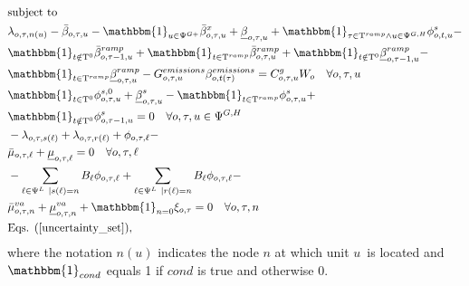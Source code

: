 \documentclass[final]{IEEEtran}
\newcommand{\Tau}{\mathrm{T}}
\begin{document}
\begin{align}
&\text{subject to} \nonumber \\
&\lambda_{o, \tau, n(u)} - \bar{\beta}_{o, \tau, u} - \mathbbm{1}_{u \in \Psi^{G+}} \bar{\beta}^x_{o, \tau, u} + \underline{\beta}_{o, \tau, u} + \mathbbm{1}_{\tau \in \Tau^{ramp} \land u \in \Psi^{G, H}} \phi_{o, t, u}^{s} - \nonumber \\
&\mathbbm{1}_{t \notin \Tau^0} \bar{\beta}_{o, \tau - 1, u}^{ramp} + \mathbbm{1}_{t \in \Tau^{ramp}} \bar{\beta}_{o, \tau, u}^{ramp} + \mathbbm{1}_{t \notin \Tau^0} \underline{\beta}_{o, \tau - 1, u}^{ramp} - \nonumber \\
&\label{sub_constr1}\mathbbm{1}_{t \in \Tau^{ramp}} \underline{\beta}_{o, \tau, u}^{ramp} - G_{o, \tau, u}^{emissions} \beta_{o, t(\tau)}^{emissions} = C^g_{o, \tau, u}  W_o \quad \forall o, \tau, u \\
&\mathbbm{1}_{t \in \Tau^0} \phi_{o, \tau, u}^{s,0} + \underline{\beta}_{o, \tau, u}^s - \mathbbm{1}_{t \in \Tau^{ramp}} \phi_{o, \tau, u}^{s} + \nonumber \\
&\mathbbm{1}_{t \notin \Tau^0} \phi_{o, \tau - 1, u}^{s} = 0 \quad \forall o, \tau, u \in \Psi^{G, H} \\
&-\lambda_{o, \tau, s(\ell)} + \lambda_{o, \tau, r(\ell)} + \phi_{o, \tau, \ell} - \nonumber \\
&\bar{\mu}_{o, \tau, \ell} + \underline{\mu}_{o, \tau, \ell} = 0 \quad \forall o, \tau, \ell \\
&-\sum\limits_{\ell \in \Psi^L | s(\ell) = n} B_\ell \phi_{o, \tau, \ell} + \sum\limits_{\ell \in \Psi^L | r(\ell) = n} B_\ell \phi_{o, \tau, \ell} - \nonumber \\
&\bar{\mu}^{va}_{o, \tau, n} + \underline{\mu}^{va}_{o, \tau, n} + \mathbbm{1}_{n = 0} \xi_{o, \tau} = 0 \quad \forall o, \tau, n \\
&\label{sub_last}\text{Eqs. } (\ref{uncertainty_set}),
\end{align}
where the notation $n(u)$ indicates the node $n$ at which unit $u$ is located and $\mathbbm{1}_{cond}$ equals 1 if $cond$ is true and otherwise 0.
\end{document}
